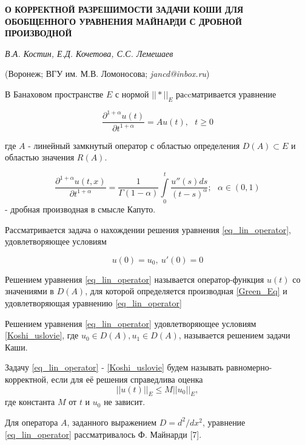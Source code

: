 
\begin{center}
    {\bf О КОРРЕКТНОЙ РАЗРЕШИМОСТИ ЗАДАЧИ КОШИ ДЛЯ ОБОБЩЕННОГО УРАВНЕНИЯ МАЙНАРДИ С ДРОБНОЙ ПРОИЗВОДНОЙ}

    {\it В.А. Костин, Е.Д. Кочетова, С.С. Лемешаев}

    (Воронеж; ВГУ им. М.В. Ломоносова; {\it jancd@inbox.ru})
\end{center}



В Банаховом пространстве $E$ с нормой $||*||_E$ раccматривается уравнение

\begin{equation}\label{eq_lin_operator}
	\frac{\partial^{1+\alpha} u(t)}{\partial t^{1+\alpha}} = Au(t), \ \ \ t \geqslant 0
\end{equation}

где $A$ - линейный замкнутый оператор с областью определения $D(A) \subset E$ и областью значения $R(A)$.

\begin{equation}\label{Green_Eq}
        \frac{\partial^{1+\alpha}u(t,x)}{\partial t^{1+\alpha}} = \frac{1}{\Gamma(1-\alpha)} \int\limits_0^t \frac{u''(s)ds}{(t - s)^{\alpha}}; \ \ \ \alpha \in (0, 1)
\end{equation}
 - дробная производная в смысле Капуто.
\vspace{3mm}


Рассматривается задача о нахождении решения уравнения \ref{eq_lin_operator}, удовлетворяющее условиям

\begin{equation}\label{Koshi_uslovie}
	u(0) = u_0, \ u'(0) = 0
\end{equation}

\begin{definition}
	Решением уравнения \ref{eq_lin_operator} называется оператор-функция $u(t)$ со значениями в $D(A)$, для которой определяется производная \ref{Green_Eq} и удовлетворяющая уравнению \ref{eq_lin_operator}
\end{definition}

\begin{definition}
	Решением уравнения \ref{eq_lin_operator} удовлетворяющее условиям \ref{Koshi_uslovie}, где $u_0 \in D(A), u_1 \in D(A)$, называется решением задачи Каши.
\end{definition}

\begin{definition}
	Задачу \ref{eq_lin_operator} - \ref{Koshi_uslovie} будем называть равномерно-корректной, если для её решения справедлива оценка
	\begin{equation}\label{ocenka}
		||u(t)||_E \leq M||u_0||_E,
	\end{equation}
	где константа $M$ от $t$ и $u_0$ не зависит.
\end{definition}
Для оператора $A$, заданного выражением $D=d^2/dx^2$, уравнение \ref{eq_lin_operator} рассматривалось Ф. Майнарди [7].
\vspace{3mm}


